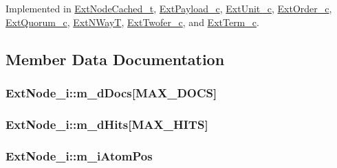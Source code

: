 Implemented in \hyperlink{classExtNodeCached__t_a261d7090726cbe7da5ce4df8164e454a}{Ext\-Node\-Cached\-\_\-t}, \hyperlink{classExtPayload__c_aed53e2a280ecdae8ec5a6518d5cedb06}{Ext\-Payload\-\_\-c}, \hyperlink{classExtUnit__c_ad3fca4d882746b4e4930f18802aacc34}{Ext\-Unit\-\_\-c}, \hyperlink{classExtOrder__c_ae35ffdf3377ff2bcb7f1b93c7b9e5fcf}{Ext\-Order\-\_\-c}, \hyperlink{classExtQuorum__c_a78cf0e498c46fe1b27c2ad521904f08b}{Ext\-Quorum\-\_\-c}, \hyperlink{classExtNWayT_a56f222f0327ad8d5f2494869933a1fe8}{Ext\-N\-Way\-T}, \hyperlink{classExtTwofer__c_a061b634b65d5b2247e3048fdedd8d38c}{Ext\-Twofer\-\_\-c}, and \hyperlink{classExtTerm__c_ac5bc0fbec18a611cceeb6a076b01516c}{Ext\-Term\-\_\-c}.



\subsection{Member Data Documentation}
\hypertarget{classExtNode__i_a5215e69ee29f7442bfb7e94cc687d25a}{
\subsubsection[{m\-\_\-d\-Docs}]{ Ext\-Node\-\_\-i\-::m\-\_\-d\-Docs\mbox{[}{\bf M\-A\-X\-\_\-\-D\-O\-C\-S}\mbox{]}\hspace{0.3cm}{\ttfamily [protected]}}}\label{classExtNode__i_a5215e69ee29f7442bfb7e94cc687d25a}
\hypertarget{classExtNode__i_a45b5a401fb3bab19f61045de2b3bed2b}{
\subsubsection[{m\-\_\-d\-Hits}]{ Ext\-Node\-\_\-i\-::m\-\_\-d\-Hits\mbox{[}{\bf M\-A\-X\-\_\-\-H\-I\-T\-S}\mbox{]}\hspace{0.3cm}{\ttfamily [protected]}}}\label{classExtNode__i_a45b5a401fb3bab19f61045de2b3bed2b}
\hypertarget{classExtNode__i_ac122b53fbd05eae61aa5db6399fb1aa2}{
\subsubsection[{m\-\_\-i\-Atom\-Pos}]{ Ext\-Node\-\_\-i\-::m\-\_\-i\-Atom\-Pos}}\label{classExtNode__i_ac122b53fbd05eae61aa5db6399fb1aa2}


